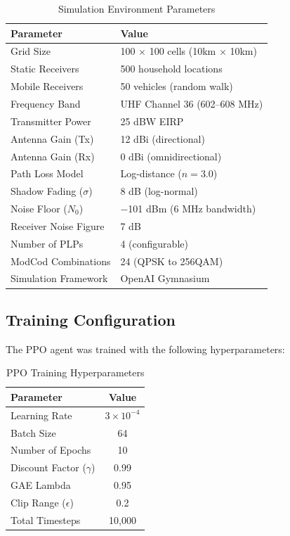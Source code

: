 \documentclass[conference]{IEEEtran}
\begin{document}
\begin{table}[h]
\caption{Simulation Environment Parameters}
\centering
\begin{tabular}{|l|l|}
\hline
\textbf{Parameter} & \textbf{Value} \\
\hline
Grid Size & 100 $\times$ 100 cells (10km $\times$ 10km) \\
Static Receivers & 500 household locations \\
Mobile Receivers & 50 vehicles (random walk) \\
Frequency Band & UHF Channel 36 (602--608 MHz) \\
Transmitter Power & 25 dBW EIRP \\
Antenna Gain (Tx) & 12 dBi (directional) \\
Antenna Gain (Rx) & 0 dBi (omnidirectional) \\
Path Loss Model & Log-distance ($n = 3.0$) \\
Shadow Fading ($\sigma$) & 8 dB (log-normal) \\
Noise Floor ($N_0$) & $-$101 dBm (6 MHz bandwidth) \\
Receiver Noise Figure & 7 dB \\
Number of PLPs & 4 (configurable) \\
ModCod Combinations & 24 (QPSK to 256QAM) \\
Simulation Framework & OpenAI Gymnasium \cite{b16} \\
\hline
\end{tabular}
\label{tab:sim_env}
\end{table}

\subsection{Training Configuration}

The PPO agent was trained with the following hyperparameters:

\begin{table}[h]
\caption{PPO Training Hyperparameters}
\centering
\begin{tabular}{|l|c|}
\hline
\textbf{Parameter} & \textbf{Value} \\
\hline
Learning Rate & $3 \times 10^{-4}$ \\
Batch Size & 64 \\
Number of Epochs & 10 \\
Discount Factor ($\gamma$) & 0.99 \\
GAE Lambda & 0.95 \\
Clip Range ($\epsilon$) & 0.2 \\
Total Timesteps & 10,000 \\
\hline
\end{tabular}
\label{tab:hyperparameters}
\end{table}
\end{document}
